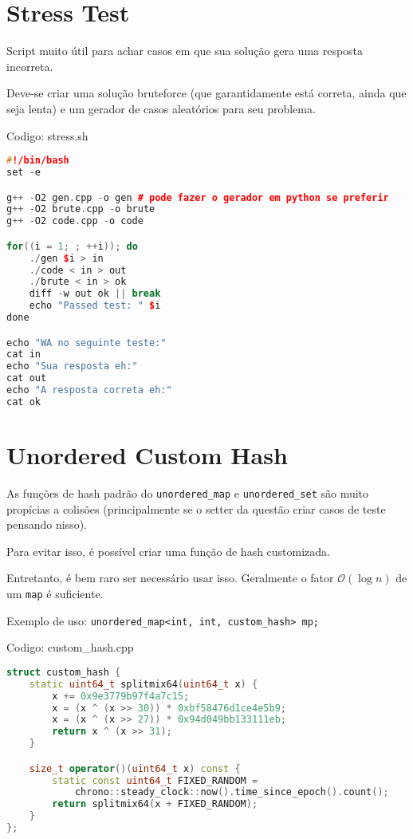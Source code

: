 \documentclass[10pt, a4paper, oneside]{book}
\begin{document}
\section{Stress Test}


Script muito útil para achar casos em que sua solução gera uma resposta incorreta.

Deve-se criar uma solução bruteforce (que garantidamente está correta, ainda que seja lenta) e um gerador de casos aleatórios para seu problema.
\hfill

Codigo: stress.sh

\begin{lstlisting}[language=C++]
#!/bin/bash
set -e

g++ -O2 gen.cpp -o gen # pode fazer o gerador em python se preferir
g++ -O2 brute.cpp -o brute
g++ -O2 code.cpp -o code

for((i = 1; ; ++i)); do
    ./gen $i > in
    ./code < in > out
    ./brute < in > ok
    diff -w out ok || break
    echo "Passed test: " $i
done

echo "WA no seguinte teste:"
cat in
echo "Sua resposta eh:"
cat out
echo "A resposta correta eh:"
cat ok\end{lstlisting}
\hfill

\section{Unordered Custom Hash}


As funções de hash padrão do \texttt{unordered\_map} e \texttt{unordered\_set} são muito propícias a colisões (principalmente se o setter da questão criar casos de teste pensando nisso).

Para evitar isso, é possível criar uma função de hash customizada.



Entretanto, é bem raro ser necessário usar isso. Geralmente o fator $\mathcal{O}(\log n)$ de um \texttt{map} é suficiente.



Exemplo de uso: \texttt{unordered\_map<int, int, custom\_hash> mp;}
\hfill

Codigo: custom\_hash.cpp

\begin{lstlisting}[language=C++]
struct custom_hash {
    static uint64_t splitmix64(uint64_t x) {
        x += 0x9e3779b97f4a7c15;
        x = (x ^ (x >> 30)) * 0xbf58476d1ce4e5b9;
        x = (x ^ (x >> 27)) * 0x94d049bb133111eb;
        return x ^ (x >> 31);
    }

    size_t operator()(uint64_t x) const {
        static const uint64_t FIXED_RANDOM =
            chrono::steady_clock::now().time_since_epoch().count();
        return splitmix64(x + FIXED_RANDOM);
    }
};\end{lstlisting}
\hfill
\end{document}
